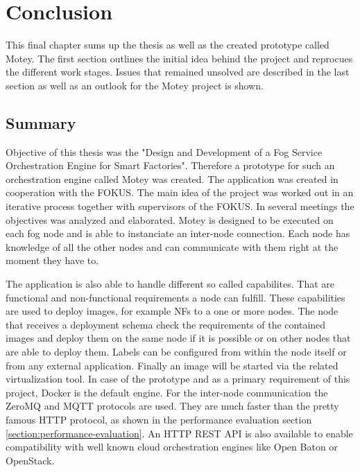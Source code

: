 \chapter{Conclusion}
\label{chapter:conclusion}
\minitoc\vspace{.5cm}
This final chapter sums up the thesis as well as the created prototype called Motey.
The first section outlines the initial idea behind the project and reprocues the different work stages.
Issues that remained unsolved are described in the last section as well as an outlook for the Motey project is shown.

\section{Summary}
Objective of this thesis was the "Design and Development of a Fog Service Orchestration Engine for Smart Factories".
Therefore a prototype for such an orchestration engine called Motey was created.
The application was created in cooperation with the \acf{FOKUS}.
The main idea of the project was worked out in an iterative process together with supervisors of the \ac{FOKUS}.
In several meetings the objectives was analyzed and elaborated.
Motey is designed to be executed on each fog node and is able to instanciate an inter-node connection.
Each node has knowledge of all the other nodes and can communicate with them right at the moment they have to.\newline

The application is also able to handle different so called capabilites.
That are functional and non-functional requirements a node can fulfill.
These capabilities are used to deploy images, for example \acp{NF} to a one or more nodes.
The node that receives a deployment schema check the requirements of the contained images and deploy them on the same node if it is possible or on other nodes that are able to deploy them.
Labels can be configured from within the node itself or from any external application.
Finally an image will be started via the related virtualization tool.
In case of the prototype and as a primary requirement of this project, Docker is the default engine.
For the inter-node communication the ZeroMQ and \ac{MQTT} protocols are used.
They are much faster than the pretty famous \ac{HTTP} protocol, as shown in the performance evaluation section \ref{section:performance-evaluation}.
An \ac{HTTP} \ac{REST} \ac{API} is also available to enable compatibility with well known cloud orchestration engines like Open Baton or OpenStack.

